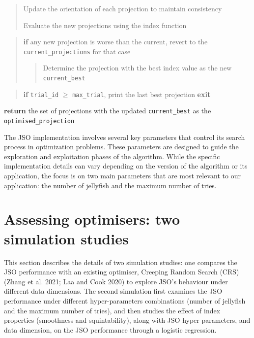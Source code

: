 \documentclass[
  12pt,
]{interact}
\theoremstyle{plain}
\begin{document}
\begin{tcolorbox}
\begin{quote}
Update the orientation of each projection to maintain consistency

Evaluate the new projections using the index function
\end{quote}

\begin{quote}
\textbf{if} any new projection is worse than the current, revert to the
\texttt{current\_projections} for that case

\begin{quote}
Determine the projection with the best index value as the new
\texttt{current\_best}
\end{quote}
\end{quote}

\begin{quote}
\textbf{if} \texttt{trial\_id} \(\ge\) \texttt{max\_trial}, print the
last best projection \textbf{exit}
\end{quote}

\textbf{return} the set of projections with the updated
\texttt{current\_best} as the \texttt{optimised\_projection}

\end{tcolorbox}

The JSO implementation involves several key parameters that control its
search process in optimization problems. These parameters are designed
to guide the exploration and exploitation phases of the algorithm. While
the specific implementation details can vary depending on the version of
the algorithm or its application, the focus is on two main parameters
that are most relevant to our application: the number of jellyfish and
the maximum number of tries.

\hypertarget{sec-sim-deets}{%
\section{Assessing optimisers: two simulation
studies}\label{sec-sim-deets}}

This section describes the details of two simulation studies: one
compares the JSO performance with an existing optimiser, Creeping Random
Search (CRS) (Zhang et al. 2021; Laa and Cook 2020) to explore JSO's
behaviour under different data dimensions. The second simulation first
examines the JSO performance under different hyper-parameters
combinations (number of jellyfish and the maximum number of tries), and
then studies the effect of index properties (smoothness and
squintability), along with JSO hyper-parameters, and data dimension, on
the JSO performance through a logistic regression.
\end{document}
